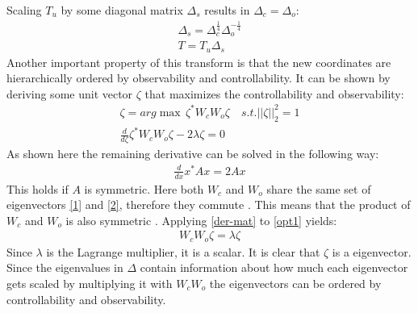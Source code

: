 Scaling \(T_u\) by some diagonal matrix \(\Delta_s\) results in \(\Delta_c = \Delta_o\):
\begin{gather}
\Delta_s = \Delta_c^{\frac{1}{4}}\Delta_o^{-\frac{1}{4}} \\
T = T_u \Delta_s
\end{gather}
Another important property of this transform is that the new coordinates are hierarchically ordered by observability and controllability.
It can be shown by deriving some unit vector \(\zeta\) that maximizes the controllability and observability:
\begin{gather}
\zeta = arg\max \, \zeta^{*}W_cW_o\zeta \quad s.t. ||\zeta||_2^{2} = 1 \\
\frac{d}{d\zeta} \zeta^{*}W_cW_o\zeta - 2\lambda \zeta = 0 \label{opt1}
\end{gather}
As shown here \cite{170373} the remaining derivative can be solved in the following way:
\begin{gather}
\frac{d}{dx} x^{*}Ax = 2Ax \label{der-mat}
\end{gather}
This holds if \(A\) is symmetric. 
Here both \(W_c\) and \(W_o\) share the same set of eigenvectors \ref{1} and \ref{2}, therefore they commute \cite{170371}.
This means that the product of \(W_c\) and \(W_o\) is also symmetric \cite{170372}.
Applying \ref{der-mat} to \ref{opt1} yields:
\begin{gather}
W_cW_o\zeta = \lambda \zeta
\end{gather}
Since \(\lambda\) is the Lagrange multiplier, it is a scalar. 
It is clear that \(\zeta\) is a eigenvector.
Since the eigenvalues in \(\Delta\) contain information about how much each eigenvector gets scaled by multiplying it with \(W_cW_o\) the eigenvectors can be ordered by controllability and observability.

